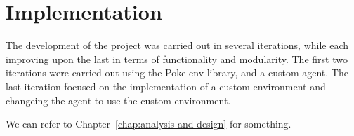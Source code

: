 \chapter{Implementation}
\label{chap:implementation}

The development of the project was carried out in several iterations, while each 
improving upon the last in terms of functionality and modularity.
The first two iterations were carried out using the Poke-env library, and a 
custom agent. The last iteration focused on the implementation of a custom 
environment and changeing the agent to use the custom environment.


We can refer to Chapter~\ref{chap:analysis-and-design} for something.









